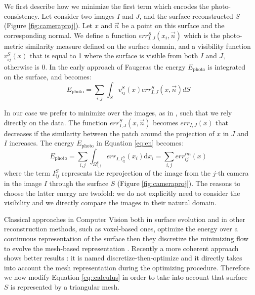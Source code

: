 We first describe how we minimize the first term which encodes the photo-consistency.
Let consider two images $I$ and $J$, and the surface reconstructed $\mathit{S}$ (Figure \ref{fig:cameraproj}). Let $x$ and $\overrightarrow{n}$ be a point on this surface and the corresponding normal. 
We define a function $err^S_{I, J}(x_i,\overrightarrow{n})$ which is the photo-metric similarity measure defined on the surface domain, and a visibility function $v^{\mathit{S}}_{ij}(x)$ that is equal to 1 where the surface is visible from both $I$ and $J$, otherwise is 0. 
In the early approach of Faugeras \etal \cite{faugeras2002variational} the energy $E_{\textrm{photo}}$ is integrated on the surface, and becomes:
\begin{equation}
 E_{\textrm{photo}} = \sum_{i,j}\int_{\mathit{S}} v^{\mathit{S}}_{ij}(x) err^S_{I,J}(x, \overrightarrow{n}) d\mathit{S}
\end{equation}


In our case we prefer to minimize  over the images, as in \cite{pons2007multi}, such that we rely directly on the data.
The function $err^S_{I, J}(x,\overrightarrow{n})$ becomes 
$err_{I, J}(x)$ that decreases if the similarity between the patch around the projection of $x$ in  $J$ and $I$ increases.
The energy $E_{\textrm{photo}}$ in Equation \eqref{eq:en} becomes:
\begin{equation}
\label{eq:energy_photo}
  E_{\textrm{photo}} = \sum_{i,j}\int_{\Omega^{\textrm{S}}_{i,j}} err_{I, I_{ij}^{\mathit{S}}}(x_i)\textrm{d}x_i = \sum_{i,j} \mathit{err}^{im}_{ij}(x)
\end{equation}
where the term $I_{ij}^{\mathit{S}}$ represents the reprojection of the image from the $j$-th camera in the image $I$ through the surface $\mathit{S}$
(Figure \ref{fig:cameraproj}).
The reasons to choose the latter energy are twofold: we do not explicitly need to consider the visibility and we directly compare the images in their natural domain.

Classical approaches in Computer Vision both in surface evolution and in other reconstruction methods, such as voxel-based ones, optimize the energy over a continuous representation of the surface then they discretize the minimizing flow to evolve the mesh-based representation \cite{pons2007multi,faugeras2002variational}. Recently a more coherent approach shows better results \cite{vu_et_al_2012,delaunoy_et_al_08}: it is named discretize-then-optimize and it directly takes into account the mesh representation during the optimizing procedure. 
Therefore we now modify Equation \eqref{eq::calculus} in order to take into account that  surface $\mathit{S}$ is represented by a triangular mesh.


